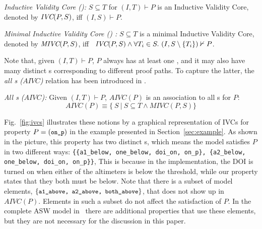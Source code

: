 \begin{definition}{\emph{Inductive Validity Core (\ivc)\cite{Ghass16}:}}
  \label{def:ivc}
  $S \subseteq T$ for $(I, T)\vdash P$ is an Inductive Validity Core,
  denoted by $\textit{IVC}(P, S)$, iff $(I, S) \vdash P $.
\end{definition}

\begin{definition}{\emph{Minimal Inductive Validity Core (\mivc) \cite{Ghass16}:}}
  \label{def:minimal-ivc}
  $S \subseteq T$ is a minimal Inductive Validity Core,
  denoted by $\textit{MIVC}(P, S)$, iff ~$\textit{IVC}(P, S) \wedge \forall T_i \in S.~ (I, S\setminus\{ T_i \}) \nvdash P$.
\end{definition}


Note that, given $(I, T) \vdash P$, $P$ always has at least one \mivc, and it may also have many distinct \mivc s corresponding to different proof paths. To capture the latter, the \emph{all \mivc s ($AIVC$)} relation has been introduced in \cite{Murugesan16:renext}.
\begin{definition}{\emph{All \mivc s ($AIVC$):}}
    \label{def:allivcs}
    Given $(I, T) \vdash P$, $AIVC(P)$ is an association to all \mivc s for $P$:
    $$ AIVC(P) \equiv  \{\ S~|~S \subseteq T \land  MIVC(P, S)\} $$
\end{definition}

Fig.~\ref{fig:ivcs} illustrates these notions by a graphical representation of IVCs for property $P = (\small{\texttt{on\_p}})$ in the example presented in Section~\ref{sec:example}. As shown in the picture, this property has two distinct \mivc s, which means the model satisfies $P$ in two different ways:  \texttt{\{\{a1\_below, one\_below, doi\_on, on\_p\}, \{a2\_below, one\_below, doi\_on, on\_p\}\}}, This is because in the implementation, the DOI is turned on when either of the altimeters is below the threshold, while our property states that they both must be below.
Note that there is a subset of model elements, $\{{\small \texttt{a1\_above, a2\_above, both\_above}}\}$, that does not show up in $AIVC(P)$. Elements in such a subset
do not affect the satisfaction of $P$.  In the complete ASW model in~\cite{HCW02:ase-deviation} there are additional properties that use these elements, but they are not necessary for the discussion in this paper.

